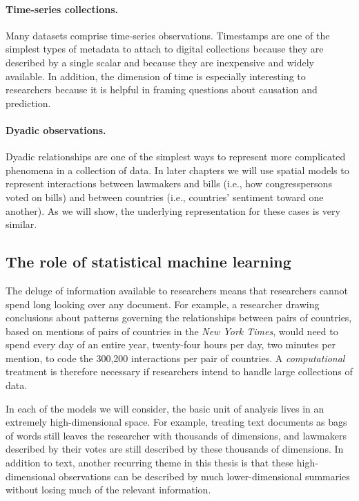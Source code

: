 \paragraph{Time-series collections.}  Many datasets comprise
time-series observations.  Timestamps are one of the simplest types of
metadata to attach to digital collections because they are described
by a single scalar and because they are inexpensive and widely
available.  In addition, the dimension of time is especially
interesting to researchers because it is helpful in framing questions
about causation and prediction.

\paragraph{Dyadic observations.}  Dyadic relationships are one of the
simplest ways to represent more complicated phenomena in a collection
of data. In later chapters we will use spatial models to represent
interactions between lawmakers and bills (i.e., how congresspersons voted
on bills) and between countries (i.e., countries' sentiment
toward one another).  As we will show, the underlying representation
for these cases is very similar.

\subsection*{The role of statistical machine learning}

The deluge of information available to researchers means that
researchers cannot spend long looking over any document.  For example,
a researcher drawing conclusions about patterns governing the
relationships between pairs of countries, based on mentions of pairs
of countries in the \emph{New York Times}, would need to spend every
day of an entire year, twenty-four hours per day, two minutes per
mention, to code the 300,200 interactions per pair of countries.  A
\emph{computational} treatment is therefore necessary if researchers
intend to handle large collections of data.

In each of the models we will consider, the basic unit of analysis
lives in an extremely high-dimensional space.  For example, treating
text documents as bags of words still leaves the researcher with
thousands of dimensions, and lawmakers described by their votes are
still described by these thousands of
dimensions.%
In addition to text, another recurring theme in this thesis is that
these high-dimensional observations can be described by much
lower-dimensional summaries without losing much of the relevant
information.

